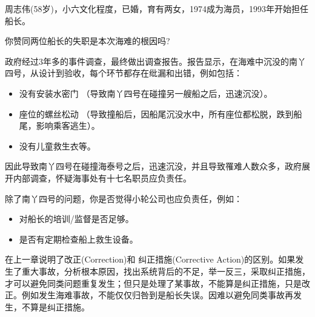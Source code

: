 周志伟(58岁)，小六文化程度，已婚，育有两女，1974成为海员，1993年开始担任船长。



你赞同两位船长的失职是本次海难的根因吗?

政府经过3年多的事件调查，最终做出调查报告。报告显示，在海难中沉没的南丫四号，从设计到验收，每个环节都存在纰漏和出错，例如包括：

\begin{itemize}
\tightlist
\item
  没有安装水密门 （导致南丫四号在碰撞另一艘船之后，迅速沉没）。
\item
  座位的螺丝松动
  （导致撞船后，因船尾沉没水中，所有座位都松脱，跌到船尾，影响乘客逃生）。
\item
  没有儿童救生衣等。
\end{itemize}

因此导致南丫四号在碰撞海泰号之后，迅速沉没，并且导致罹难人数众多，政府展开内部调查，怀疑海事处有十七名职员应负责任。

除了南丫四号的问题，你是否觉得小轮公司也应负责任，例如：

\begin{itemize}
\tightlist
\item
  对船长的培训/监督是否足够。
\item
  是否有定期检查船上救生设备。
\end{itemize}

在上一章说明了改正(Correction)和 纠正措施(Corrective Action)的区别。如果发生了重大事故，分析根本原因，找出系统背后的不足，举一反三，采取纠正措施，才可以避免同类问题重复发生；但只是处理了某事故，不能算是纠正措施，只是改正。例如发生海难事故，不能仅仅归咎到是船长失误。因难以避免同类事故再发生，不算是纠正措施。\\

